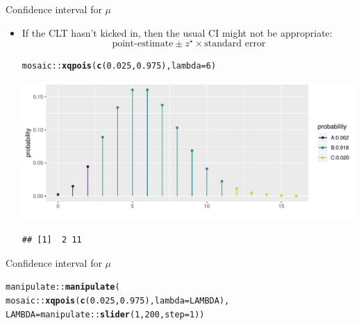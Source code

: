 \documentclass[handout]{beamer}\usepackage[]{graphicx}\usepackage[]{color}
\newcommand{\hlnum}[1]{\textcolor[rgb]{0.686,0.059,0.569}{#1}}%
\newcommand{\hlopt}[1]{\textcolor[rgb]{0,0,0}{#1}}%
\newcommand{\hlstd}[1]{\textcolor[rgb]{0.345,0.345,0.345}{#1}}%
\newcommand{\hlkwc}[1]{\textcolor[rgb]{0.333,0.667,0.333}{#1}}%
\newcommand{\hlkwd}[1]{\textcolor[rgb]{0.737,0.353,0.396}{\textbf{#1}}}%
\newenvironment{knitrout}{}{} %
\begin{document}
\begin{frame}[fragile]{Confidence interval for $\mu$}
\begin{itemize}
\setlength\itemsep{2em}
\item If the CLT hasn't kicked in, then the usual CI might not be appropriate: $$\textrm{point-estimate} \pm z^\star  \times \textrm{standard error}$$

\begin{knitrout}\scriptsize
{}\color{fgcolor}
\begin{alltt}
\hlstd{mosaic}\hlopt{::}\hlkwd{xqpois}\hlstd{(}\hlkwd{c}\hlstd{(}\hlnum{0.025}\hlstd{,} \hlnum{0.975}\hlstd{),} \hlkwc{lambda} \hlstd{=} \hlnum{6}\hlstd{)}
\end{alltt}


{\centering \includegraphics[width=1\linewidth]{figure/unnamed-chunk-9-1} 

}


\begin{verbatim}
## [1]  2 11
\end{verbatim}

\end{knitrout}

\end{itemize}
\end{frame}


\begin{frame}[fragile]{Confidence interval for $\mu$}
\begin{knitrout}\scriptsize
{}\color{fgcolor}
\begin{alltt}
\hlstd{manipulate}\hlopt{::}\hlkwd{manipulate}\hlstd{(}
\hlstd{mosaic}\hlopt{::}\hlkwd{xqpois}\hlstd{(}\hlkwd{c}\hlstd{(}\hlnum{0.025}\hlstd{,} \hlnum{0.975}\hlstd{),} \hlkwc{lambda} \hlstd{= LAMBDA),}
\hlkwc{LAMBDA} \hlstd{= manipulate}\hlopt{::}\hlkwd{slider}\hlstd{(}\hlnum{1}\hlstd{,} \hlnum{200}\hlstd{,} \hlkwc{step} \hlstd{=} \hlnum{1}\hlstd{))}
\end{alltt}

\end{knitrout}
\end{frame}
\end{document}
